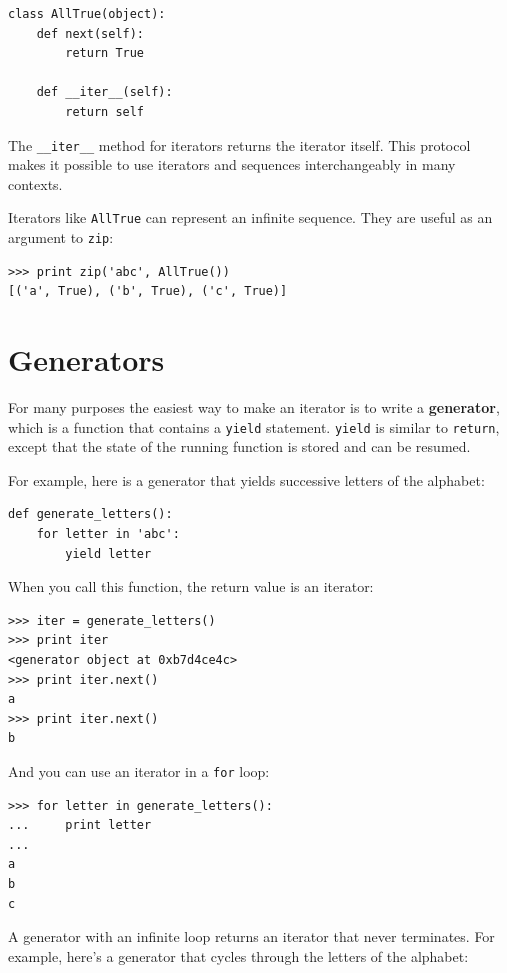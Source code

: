 \documentclass[10pt]{book}
\begin{document}
\begin{verbatim}
class AllTrue(object):
    def next(self):
        return True

    def __iter__(self):
        return self
\end{verbatim}

The \verb"__iter__" method for iterators returns the iterator
itself.  This protocol makes it possible to use iterators
and sequences interchangeably in many contexts.

Iterators like {\tt AllTrue} can represent an infinite sequence.
They are useful as an argument to {\tt zip}:

\begin{verbatim}
>>> print zip('abc', AllTrue())
[('a', True), ('b', True), ('c', True)]
\end{verbatim}


\section{Generators}

For many purposes the easiest way to make an iterator is to
write a {\bf generator}, which is a function that contains a
{\tt yield} statement.  {\tt yield} is similar to {\tt return},
except that the state of the running function is stored and
can be resumed.

For example, here is a generator that yields successive letters
of the alphabet:

\begin{verbatim}
def generate_letters():
    for letter in 'abc':
        yield letter
\end{verbatim}

When you call this function, the return value is an iterator:

\begin{verbatim}
>>> iter = generate_letters()
>>> print iter
<generator object at 0xb7d4ce4c>
>>> print iter.next()
a
>>> print iter.next()
b
\end{verbatim}

And you can use an iterator in a {\tt for} loop:

\begin{verbatim}
>>> for letter in generate_letters():
...     print letter
...
a
b
c
\end{verbatim}

A generator with an infinite loop returns an iterator that
never terminates.  For example, here's a generator that
cycles through the letters of the alphabet:
\end{document}
